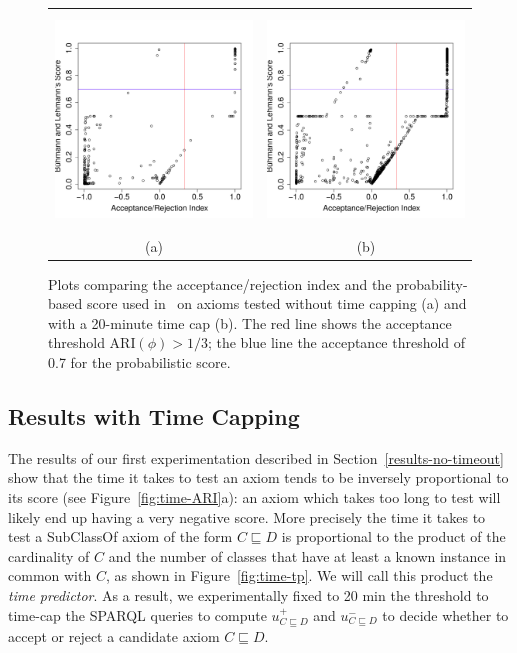 \documentclass{llncs}
\begin{document}
\begin{figure}[t]
\begin{center}
  \begin{tabular}{cc}
    \includegraphics[height=2.25in]{ARI-BLS} &
    \includegraphics[height=2.25in]{ARI-BLS-20} \\
    (a) & (b)
  \end{tabular}
\end{center}
\caption{Plots comparing the acceptance/rejection index and the probability-based
  score used in~\cite{BuehmannLehmann2012} on axioms tested without time capping (a)
  and with a 20-minute time cap (b).
  The red line shows the acceptance threshold $\mathrm{ARI}(\phi)>1/3$;
  the blue line the acceptance threshold of 0.7 for the probabilistic score.}
\label{fig:ARI-BLS}
\end{figure}


\subsection{Results with Time Capping}

The results of our first experimentation described in Section~\ref{results-no-timeout}
show that the time it takes to test an axiom tends to be inversely proportional
to its score (see Figure~\ref{fig:time-ARI}a): an axiom which takes
too long to test will likely end up having a very negative score. More precisely the time it takes to test a \textsf{SubClassOf} axiom of the form
$C \sqsubseteq D$ is proportional to the product of the cardinality of $C$
and the number of classes that have at least a known instance in common with $C$,
as shown in Figure~\ref{fig:time-tp}. We will call this product the \emph{time predictor}.
As a result, we experimentally fixed to 20 min the threshold to time-cap the SPARQL queries to compute $u^+_{C \sqsubseteq D}$ and $u^-_{C \sqsubseteq D}$
to decide whether to accept or reject a candidate axiom $C \sqsubseteq D$.
\end{document}
